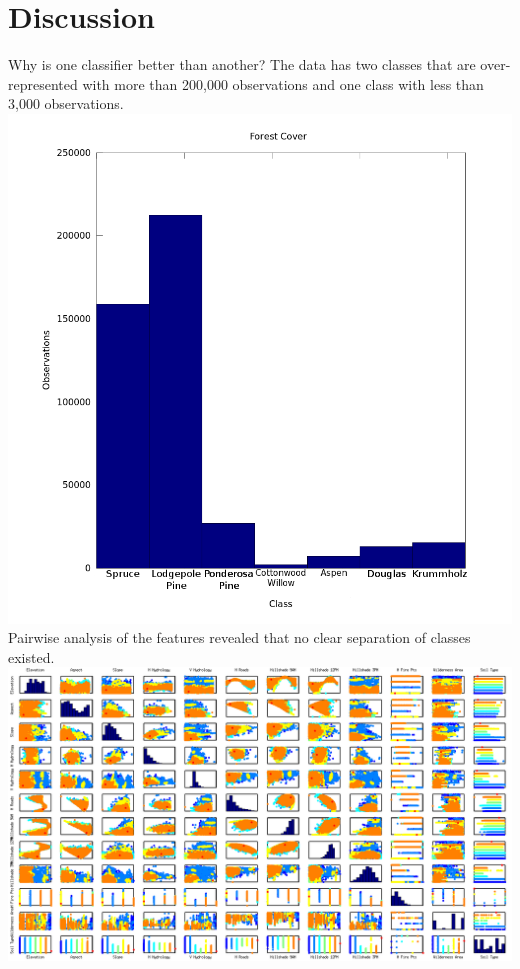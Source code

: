 \documentclass[11pt]{article}
\begin{document}
\section{Discussion}
Why is one classifier better than another?
The data has two classes that are over-represented with more than 200,000 observations and one class with less than 3,000 observations. \\
\includegraphics[width=\linewidth]{images/description.png} 
Pairwise analysis of the features revealed that no clear separation of classes existed.\\
\includegraphics[width=\linewidth]{images/featureScatterPlotMatrixHD}
\end{document}
